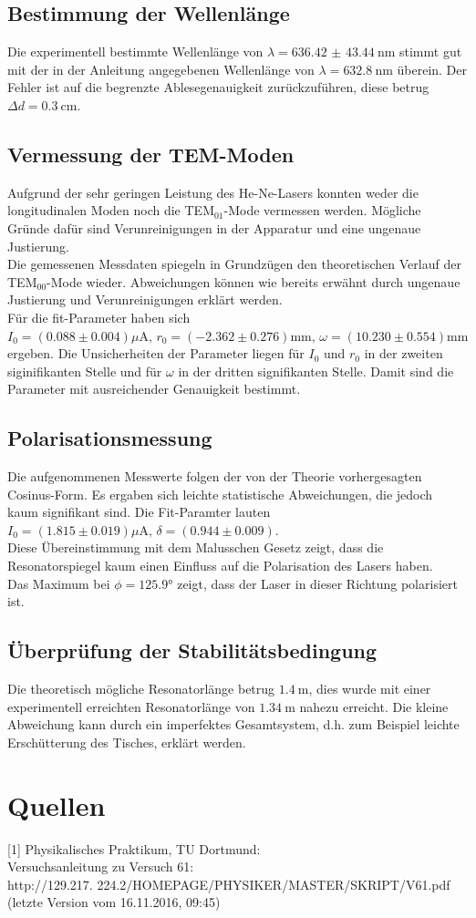 \documentclass[captions=tableheading]{scrartcl}
\begin{document}
\subsection{Bestimmung der Wellenlänge}
Die experimentell bestimmte Wellenlänge von $\lambda = \SI{636.42(4344)}{\nano\metre}$ stimmt gut mit der in der Anleitung angegebenen Wellenlänge von $\lambda = \SI{632.8}{\nano\metre}$ überein. Der Fehler ist auf die begrenzte Ablesegenauigkeit zurückzuführen, diese betrug $\Delta d=\SI{0.3}{\centi\metre}$.

\subsection{Vermessung der TEM-Moden}
Aufgrund der sehr geringen Leistung des He-Ne-Lasers konnten weder die longitudinalen Moden noch die TEM$_{01}$-Mode vermessen werden. Mögliche Gründe dafür sind Verunreinigungen in der Apparatur und eine ungenaue Justierung. \\
Die gemessenen Messdaten spiegeln in Grundzügen den theoretischen Verlauf der TEM$_{00}$-Mode wieder. Abweichungen können wie bereits erwähnt durch ungenaue Justierung und Verunreinigungen erklärt werden. \\
Für die fit-Parameter haben sich  $I_0= (0.088 \pm 0.004) \si{\mu\ampere},\,r_0= (-2.362 \pm 0.276) \si{\milli\metre},\,\omega=  (10.230  \pm 0.554) \si{\milli\metre}$ ergeben. Die Unsicherheiten der Parameter liegen für $I_0$ und $r_0$ in der zweiten siginifikanten Stelle und für $\omega$ in der dritten signifikanten Stelle. Damit sind die Parameter mit ausreichender Genauigkeit bestimmt.

\subsection{Polarisationsmessung}
Die aufgenommenen Messwerte folgen der von der Theorie vorhergesagten Cosinus-Form. Es ergaben sich leichte statistische Abweichungen, die jedoch kaum signifikant sind. Die Fit-Paramter lauten $I_0=(1.815 \pm 0.019)\si{\mu\ampere},\, \delta=(0.944 \pm 0.009)$. \\
Diese Übereinstimmung mit dem Malusschen Gesetz zeigt, dass die Resonatorspiegel kaum einen Einfluss auf die Polarisation des Lasers haben. \\
Das Maximum bei $\phi=\ang{125.9}$ zeigt, dass der Laser in dieser Richtung polarisiert ist.

\subsection{Überprüfung der Stabilitätsbedingung}
Die theoretisch mögliche Resonatorlänge betrug $\SI{1.4}{\metre}$, dies wurde mit einer experimentell erreichten Resonatorlänge von $\SI{1.34}{\metre}$ nahezu erreicht. Die kleine Abweichung kann durch ein imperfektes Gesamtsystem, d.h. zum Beispiel leichte Erschütterung des Tisches, erklärt werden.

\section{Quellen}
{[1]} Physikalisches Praktikum, TU Dortmund: \\
Versuchsanleitung zu Versuch 61: \\
http://129.217.
224.2/HOMEPAGE/PHYSIKER/MASTER/SKRIPT/V61.pdf (letzte Version vom 16.11.2016, 09:45)\\
\end{document}
